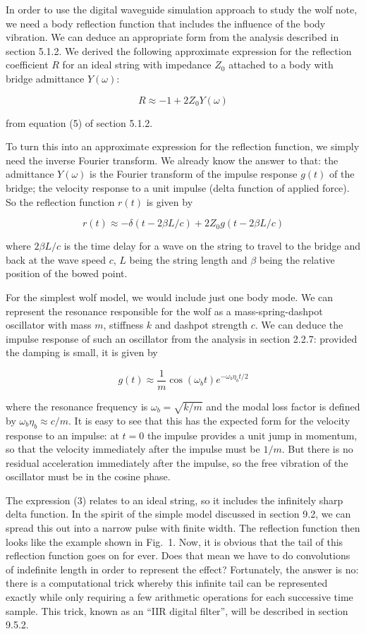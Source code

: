   In order to use the digital waveguide simulation approach to study the wolf 
  note, we need a body reflection function that includes the influence of the 
  body vibration. We can deduce an appropriate form from the analysis described 
  in section 5.1.2. We derived the following approximate expression for the 
  reflection coefficient $R$ for an ideal string with impedance $Z_0$ attached 
  to a body with bridge admittance $Y(\omega)$: 

  $$R \approx -1 + 2 Z_0 Y(\omega) \tag{1}$$ 

  from equation (5) of section 5.1.2. 

  To turn this into an approximate expression for the reflection function, we 
  simply need the inverse Fourier transform. We already know the answer to 
  that: the admittance $Y(\omega)$ is the Fourier transform of the impulse 
  response $g(t)$ of the bridge; the velocity response to a unit impulse (delta 
  function of applied force). So the reflection function $r(t)$ is given by 

  $$r(t) \approx -\delta(t-2\beta L /c) + 2Z_0 g(t-2\beta L /c) \tag{2}$$ 

  where $2\beta L/c$ is the time delay for a wave on the string to travel to 
  the bridge and back at the wave speed $c$, $L$ being the string length and 
  $\beta$ being the relative position of the bowed point. 

  For the simplest wolf model, we would include just one body mode. We can 
  represent the resonance responsible for the wolf as a mass-spring-dashpot 
  oscillator with mass $m$, stiffness $k$ and dashpot strength $c$. We can 
  deduce the impulse response of such an oscillator from the analysis in 
  section 2.2.7: provided the damping is small, it is given by 

  $$g(t) \approx \dfrac{1}{m} \cos (\omega_b t) e^{-\omega_b \eta_b t/2} 
  \tag{3}$$ 

  where the resonance frequency is $\omega_b = \sqrt{k/m}$ and the modal loss 
  factor is defined by $\omega_b \eta_b \approx c/m$. It is easy to see that 
  this has the expected form for the velocity response to an impulse: at $t=0$ 
  the impulse provides a unit jump in momentum, so that the velocity 
  immediately after the impulse must be $1/m$. But there is no residual 
  acceleration immediately after the impulse, so the free vibration of the 
  oscillator must be in the cosine phase. 

  The expression (3) relates to an ideal string, so it includes the infinitely 
  sharp delta function. In the spirit of the simple model discussed in section 
  9.2, we can spread this out into a narrow pulse with finite width. The 
  reflection function then looks like the example shown in Fig.\ 1. Now, it is 
  obvious that the tail of this reflection function goes on for ever. Does that 
  mean we have to do convolutions of indefinite length in order to represent 
  the effect? Fortunately, the answer is no: there is a computational trick 
  whereby this infinite tail can be represented exactly while only requiring a 
  few arithmetic operations for each successive time sample. This trick, known 
  as an ``IIR digital filter'', will be described in section 9.5.2. 

